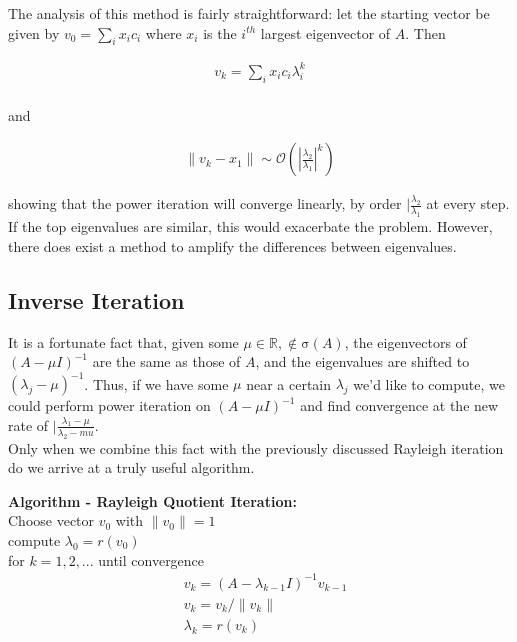 \documentclass[11pt]{article}
\newcommand{\R}{\mathbb{R}}
\begin{document}
The analysis of this method is fairly straightforward: let the starting vector be given by $v_0 = \sum \limits_i x_i c_i$ where $x_i$ is the $i^{th}$ largest eigenvector of $A$. Then 

\begin{align*}
  v_k = \sum \limits_i x_i c_i \lambda_i^k \\
\end{align*}

and

\begin{align*}
  \|v_k - x_1 \| \sim \mathcal{O}(|\frac{\lambda_2}{\lambda_1}|^k)
\end{align*}

showing that the power iteration will converge linearly, by order $|\frac{\lambda_2}{\lambda_1}$ at every step. If the top eigenvalues are similar, this would exacerbate the problem. However, there does exist a method to amplify the differences between eigenvalues.

\subsection{Inverse Iteration}

It is a fortunate fact that, given some $\mu \in \R, \not \in \mathrm{\sigma}(A)$, the eigenvectors of $(A - \mu I)^{-1}$ are the same as those of $A$, and the eigenvalues are shifted to $(\lambda_j - \mu)^{-1}$. Thus, if we have some $\mu$ near a certain $\lambda_j$ we'd like to compute, we could perform power iteration on $(A - \mu I)^{-1}$ and find convergence at the new rate of $|\frac{\lambda_1 - \mu}{\lambda_2 - mu}$. \\

Only when we combine this fact with the previously discussed Rayleigh iteration do we arrive at a truly useful algorithm.

\begin{framed}
\textbf{Algorithm - Rayleigh Quotient Iteration:} \\
\hspace{5mm} Choose vector $v_0$ with $\| v_0 \| = 1$ \\
\hspace{5mm} compute $\lambda_0 = r(v_0)$ \\
\hspace{5mm} for $k=1,2,...$ until convergence \\
\begin{align*}
  &v_k = (A - \lambda_{k-1} I)^{-1} v_{k-1} \\
  &v_k = v_k / \|v_k \| \\
  &\lambda_k = r(v_k) \\
\end{align*}
\end{framed}
\end{document}
